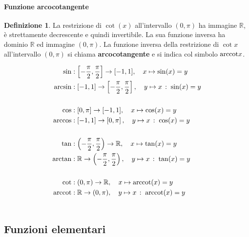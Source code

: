 \documentclass{article}
\theoremstyle{plain}
\theoremstyle{definition}
\newtheorem{defn}{Definizione}[section]
\theoremstyle{remark}
\begin{document}
\vspace{10pt}

\paragraph{Funzione arcocotangente}
\begin{bxthm}
\begin{defn}
    La restrizione di $\cot(x)$ all'intervallo $(0,\pi)$ ha immagine $\mathbb{R}$, è strettamente decrescente e quindi invertibile. La sua funzione inversa ha dominio $\mathbb{R}$ ed immagine $(0,\pi)$. 
    La funzione inversa della restrizione di $\cot x$ all'intervallo $(0,\pi)$ si chiama \textbf{arcocotangente} e si indica col simbolo $\textup{arccot} x$.
\end{defn}
\end{bxthm}

\vspace{10pt}

\begin{align*}
    \sin&:\left[-\dfrac{\pi}{2},\dfrac{\pi}{2}\right]\to[-1,1],\quad x\mapsto \sin(x)=y\\
    \arcsin&:[-1,1]\to\left[-\dfrac{\pi}{2},\dfrac{\pi}{2}\right],\quad y\mapsto x\,:\;\sin(x)=y \\\\
    \cos&:\left[0,\pi\right]\to[-1,1],\quad x\mapsto \cos(x)=y\\
    \arccos&:[-1,1]\to\left[0,\pi\right],\quad y\mapsto x\,:\;\cos(x)=y \\\\
    \tan&:\left(-\dfrac{\pi}{2},\dfrac{\pi}{2}\right)\to\mathbb{R},\quad x\mapsto \tan(x)=y\\
    \arctan&:\mathbb{R}\to\left(-\dfrac{\pi}{2},\dfrac{\pi}{2}\right),\quad y\mapsto x\,:\;\tan(x)=y \\\\
    \cot&:(0,\pi)\to\mathbb{R},\quad x\mapsto \textup{arccot}(x)=y \\
    \textup{arccot}&:\mathbb{R}\to(0,\pi),\quad y\mapsto x\,:\;\textup{arccot}(x)=y \\\\
\end{align*}

\vspace{10pt}

\subsection{Funzioni elementari}
\end{document}
